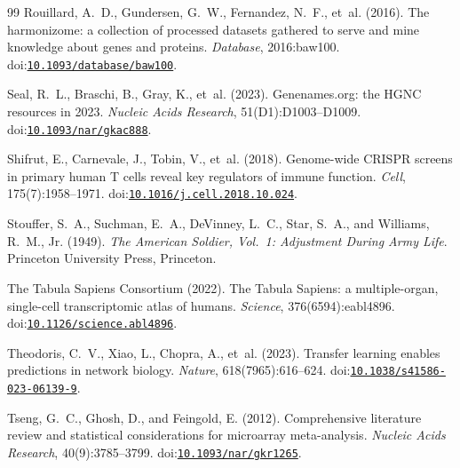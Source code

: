 \documentclass[11pt,a4paper]{article}
\begin{document}
\begin{thebibliography}{99}
Rouillard, A.~D., Gundersen, G.~W., Fernandez, N.~F., et~al. (2016).
\newblock The harmonizome: a collection of processed datasets gathered to serve and mine knowledge about genes and proteins.
\newblock \emph{Database}, 2016:baw100.
\newblock doi:\href{https://doi.org/10.1093/database/baw100}{\nolinkurl{10.1093/database/baw100}}.

Seal, R.~L., Braschi, B., Gray, K., et~al. (2023).
\newblock Genenames.org: the {HGNC} resources in 2023.
\newblock \emph{Nucleic Acids Research}, 51(D1):D1003--D1009.
\newblock doi:\href{https://doi.org/10.1093/nar/gkac888}{\nolinkurl{10.1093/nar/gkac888}}.

Shifrut, E., Carnevale, J., Tobin, V., et~al. (2018).
\newblock Genome-wide {CRISPR} screens in primary human {T} cells reveal key regulators of immune function.
\newblock \emph{Cell}, 175(7):1958--1971.
\newblock doi:\href{https://doi.org/10.1016/j.cell.2018.10.024}{\nolinkurl{10.1016/j.cell.2018.10.024}}.

Stouffer, S.~A., Suchman, E.~A., DeVinney, L.~C., Star, S.~A., and Williams, R.~M., Jr. (1949).
\newblock \emph{The American Soldier, Vol.~1: Adjustment During Army Life}.
\newblock Princeton University Press, Princeton.

{The Tabula Sapiens Consortium} (2022).
\newblock The {Tabula Sapiens}: a multiple-organ, single-cell transcriptomic atlas of humans.
\newblock \emph{Science}, 376(6594):eabl4896.
\newblock doi:\href{https://doi.org/10.1126/science.abl4896}{\nolinkurl{10.1126/science.abl4896}}.

Theodoris, C.~V., Xiao, L., Chopra, A., et~al. (2023).
\newblock Transfer learning enables predictions in network biology.
\newblock \emph{Nature}, 618(7965):616--624.
\newblock doi:\href{https://doi.org/10.1038/s41586-023-06139-9}{\nolinkurl{10.1038/s41586-023-06139-9}}.

Tseng, G.~C., Ghosh, D., and Feingold, E. (2012).
\newblock Comprehensive literature review and statistical considerations for microarray meta-analysis.
\newblock \emph{Nucleic Acids Research}, 40(9):3785--3799.
\newblock doi:\href{https://doi.org/10.1093/nar/gkr1265}{\nolinkurl{10.1093/nar/gkr1265}}.


\end{thebibliography}
\end{document}
